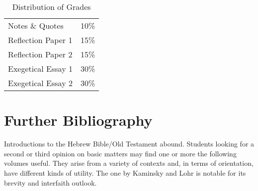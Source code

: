 \documentclass[titlepage]{article}
\newcommand\policy{../policy}
\begin{document}
\begin{table}[htbp]
  \centering
  {\lining
  \begin{tabular}{lr}
    \toprule
    Notes \& Quotes     & 10\% \\
    Reflection Paper 1  & 15\% \\
    Reflection Paper 2  & 15\% \\
    Exegetical Essay 1  & 30\% \\
    Exegetical Essay 2  & 30\% \\
    \bottomrule
  \end{tabular}}
  \caption{Distribution of Grades}
  \label{grade-dist}
\end{table}





\section{Further Bibliography}
\label{bib}

Introductions to the Hebrew Bible/Old Testament abound. Students looking
for a second or third opinion on basic matters may find one or more the
following volumes useful. They arise from a variety of contexts and, in
terms of orientation, have different kinds of utility. The one by
Kaminsky and Lohr \cite{hbfb} is notable for its brevity and interfaith
outlook.
\end{document}
